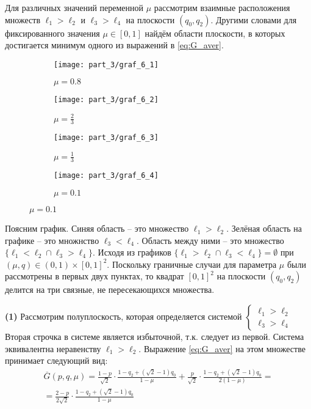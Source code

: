 	
Для различных значений переменной $\mu$ рассмотрим 
взаимные расположения множеств $\ell_1>\ell_2$ и $\ell_3>\ell_4$
на плоскости $(q_0,q_2)$. Другими словами для фиксированного 
значения $\mu \in [0,1]$ найдём области плоскости, в которых 
достигается минимум одного из выражений в \eqref{eq:G_aver}.
	
\begin{figure}[H]
   	\centering
    \begin{subfigure}[b]{0.22 \textwidth}
    	\centering
    	\texttt{[image: part\_3/graf\_6\_1]}
		\caption{$\mu=0.8$}
        \label{fig:y equals x}
    \end{subfigure}
    \hfill
    \begin{subfigure}[b]{0.22 \textwidth}
       	\centering
       	\texttt{[image: part\_3/graf\_6\_2]}
       	\caption{$\mu=\frac{2}{3}$}
       	\label{fig:three sin x}
     \end{subfigure}
     \hfill
     \begin{subfigure}[b]{0.22 \textwidth}
       	\centering
       	\texttt{[image: part\_3/graf\_6\_3]}
       	\caption{$\mu=\frac{1}{3}$}
       	\label{fig:five over x}
     \end{subfigure}
     \hfill
     \begin{subfigure}[b]{0.22 \textwidth}
       	\centering
       	\texttt{[image: part\_3/graf\_6\_4]}
		\caption{$\mu=0.1$}
        \label{fig:five over x}
     \end{subfigure}
\end{figure}
Поясним график. Синяя область -- это множество $\ell_1 > \ell_2$.
Зелёная область на графике -- это множнство $\ell_3 < \ell_4$.
Область между ними -- это множество $\{\ell_1<\ell_2 \cap \ell_3 > \ell_4\}$.
Исходя из графиков $\{\ell_1>\ell_2 \cap \ell_3 < \ell_4\} = \emptyset$ 
при $(\mu, q) \in (0, 1) \times [0, 1]^2$.
Поскольку граничные случаи для параметра $\mu$ были рассмотрены в первых
двух пунктах, то квадрат $[0,1]^2$ на плоскости $(q_0,q_2)$ делится на три
связные, не пересекающихся множества.

\textbf{(1)} 
Рассмотрим полуплоскость, которая определяется системой
$
	\begin{cases}
		\ell_1 > \ell_2 \\
		\ell_3 > \ell_4
	\end{cases}
$
Вторая строчка в системе является избыточной, т.к. следует из первой.
Система эквивалентна неравенству $\ell_1 > \ell_2$. Выражение \eqref{eq:G_aver} на этом множестве принимает следующий вид:
\begin{gather*}
	\overline G(p,q,\mu)=
	\frac{1-p}{\sqrt{2}} \cdot \frac{1-q_2+(\sqrt{2}-1)q_0}{1-\mu} + 
	\frac{p}{\sqrt{2}} \cdot \frac{1-q_2+(\sqrt{2}-1)q_0}{2(1-\mu)} = \\
	=\frac{2-p}{2\sqrt{2}}\cdot\frac{1-q_2+(\sqrt{2}-1)q_0}{1-\mu}		
\end{gather*}

